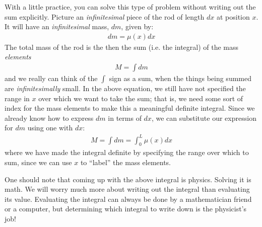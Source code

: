 With a little practice, you can solve this type of problem without writing out the sum explicitly. Picture an \textit{infinitesimal} piece of the rod of length $dx$ at position $x$. It will have an \textit{infinitesimal} mass, $dm$, given by:
\begin{align*}
dm = \mu(x) dx
\end{align*}
The total mass of the rod is the then the sum (i.e. the integral) of the mass \textit{elements}
\begin{align*}
M = \int dm
\end{align*}
and we really can think of the $\int$ sign as a sum, when the things being summed are \textit{infinitesimally} small. In the above equation, we still have not specified the range in $x$ over which we want to take the sum; that is, we need some sort of index for the mass elements to make this a meaningful definite integral. Since we already know how to express $dm$ in terms of $dx$, we can substitute our expression for $dm$ using one with $dx$:
\begin{align*}
M = \int dm = \int_0^L \mu(x) dx
\end{align*}
where we have made the integral definite by specifying the range over which to sum, since we can use $x$ to ``label'' the mass elements.

One should note that coming up with the above integral is physics. Solving it is math. We will worry much more about writing out the integral than evaluating its value. Evaluating the integral can always be done by a mathematician friend or a computer, but determining which integral to write down is the physicist's job!

